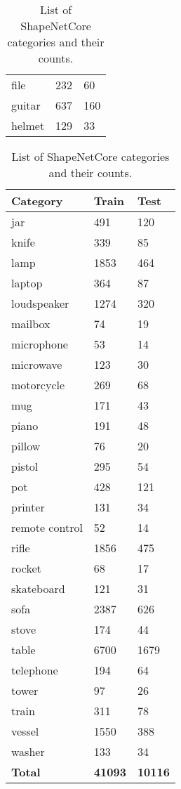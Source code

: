 \begin{table}[]
\begin{tabular}[t]{lll}
		file               & 232            & 60            \\
		guitar             & 637            & 160           \\
		helmet             & 129            & 33
	\end{tabular}
	\begin{tabular}[t]{lll}
		\hline
		\textbf{Category} & \textbf{Train} & \textbf{Test}  \\ \hline
		jar               & 491            & 120            \\
		knife             & 339            & 85             \\
		lamp              & 1853           & 464            \\
		laptop            & 364            & 87             \\
		loudspeaker       & 1274           & 320            \\
		mailbox           & 74             & 19             \\
		microphone        & 53             & 14             \\
		microwave         & 123            & 30             \\
		motorcycle        & 269            & 68             \\
		mug               & 171            & 43             \\
		piano             & 191            & 48             \\
		pillow            & 76             & 20             \\
		pistol            & 295            & 54             \\
		pot               & 428            & 121            \\
		printer           & 131            & 34             \\
		remote control    & 52             & 14             \\
		rifle             & 1856           & 475            \\
		rocket            & 68             & 17             \\
		skateboard        & 121            & 31             \\
		sofa              & 2387           & 626            \\
		stove             & 174            & 44             \\
		table             & 6700           & 1679           \\
		telephone         & 194            & 64             \\
		tower             & 97             & 26             \\
		train             & 311            & 78             \\
		vessel            & 1550           & 388            \\
		washer            & 133            & 34             \\
		\textbf{Total} & \textbf{41093} & \textbf{10116} \\
	\end{tabular}
	
	
	\caption{List of ShapeNetCore categories and their counts.}
	\label{Table:shapenetcats}
\end{table}